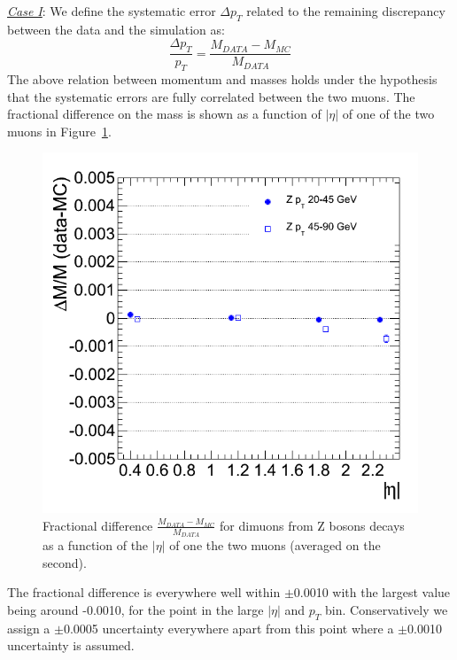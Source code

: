 \underline{\sl Case I}: We define the systematic error  $\Delta p_T$ related to the remaining discrepancy between
the data and the simulation as:
\begin{equation}
  \frac{\Delta p_T}{p_T}=\frac{M_{DATA}-M_{MC}}{M_{DATA}}
  \label{eq:syst_DATA_MC}
\end{equation}
The above relation between momentum
and masses holds under the hypothesis that the systematic errors are fully correlated between the two muons. 
The fractional difference on the mass is shown as a function of $|\eta|$ of one of the two muons in
Figure~\ref{fig:syst_DATA_MC_eta}. 
\begin{figure}[hbtp]  
\begin{center}
\includegraphics[width=\textwidth]{figures/ScaleEta_afterCorrection}
 \hspace{1cm} 
   \caption{Fractional difference $\frac{M_{DATA}-M_{MC}}{M_{DATA}}$
     for dimuons from Z bosons decays as a function of the $|\eta|$
     of one the two muons (averaged on the second).} 
   \label{fig:syst_DATA_MC_eta} 
 \end{center}
\end{figure} 
The fractional difference is everywhere well within $\pm$0.0010 with the largest value
being around -0.0010, for the point in the large $|\eta|$ and $p_T$ bin.
Conservatively we assign a $\pm$0.0005 uncertainty everywhere apart from this
point where a $\pm$0.0010 uncertainty is assumed. 

